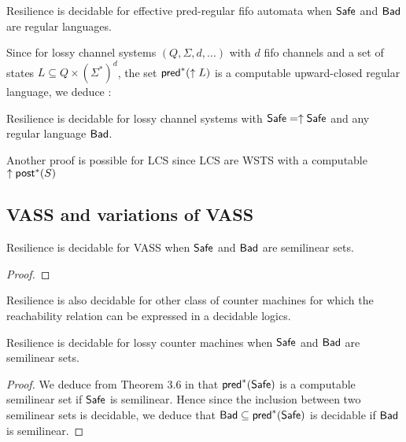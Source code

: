 \begin{theorem}{}
Resilience is decidable for effective pred-regular fifo automata when $\textsf{Safe}$ and $\textsf{Bad}$ are regular languages.
\end{theorem} 

%

Since for lossy channel systems $(Q, \Sigma,d,...)$ with $d$ fifo channels and a set of states $L \subseteq Q \times (\Sigma^*)^d$, the set $\textsf{pred}^*(\uparrow L)$ is a computable upward-closed regular language, we deduce :

\begin{corollary}
Resilience is decidable for lossy channel systems with $\textsf{Safe}=\uparrow \textsf{Safe}$ and any regular language $\textsf{Bad}$.
\end{corollary}

Another proof is possible for LCS since LCS are WSTS with a computable $\uparrow \textsf{post}^*(S)$ 
%
\subsection{VASS and variations of VASS}


\begin{theorem}{}
Resilience is decidable for VASS when $\textsf{Safe}$ and $\textsf{Bad}$ are semilinear sets.
\end{theorem}

\begin{proof}
\end{proof}

Resilience is also decidable for other class of counter machines for which the reachability relation can be expressed in a decidable logics.

\begin{theorem}{}
Resilience is decidable for lossy counter machines when $\textsf{Safe}$ and $\textsf{Bad}$ are semilinear sets.
\end{theorem}

\begin{proof}
We deduce from Theorem 3.6 in \cite{DBLP:conf/rp/Schnoebelen10} that $\textsf{pred}^*(\textsf{Safe})$ is a computable semilinear set if $\textsf{Safe}$ is semilinear. Hence since the inclusion between two semilinear sets is decidable, we deduce that $\textsf{Bad} \subseteq \textsf{pred}^*(\textsf{Safe})$ is decidable if $\textsf{Bad}$ is semilinear.
\end{proof}


